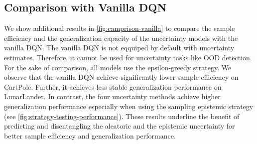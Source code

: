 
% 
% 
% 


% 
% 
% 


% 
% 
% 

\subsection{Comparison with Vanilla DQN}

We show additional results in \cref{fig:camprison-vanilla} to compare the sample efficiency and the generalization capacity of the uncertainty models with the vanilla DQN. The vanilla DQN is not eqquiped by default with uncertainty estimates. Therefore, it cannot be used for uncertainty tasks like OOD detection. For the sake of comparison, all models use the epsilon-greedy strategy. We observe that the vanilla DQN achieve significantly lower sample efficiency on CartPole. Further, it achieves less stable generalization performance on LunarLander. In contrast, the four uncertainty methods achieve higher generalization performance especially when using the sampling epistemic strategy (see \cref{fig:strategy-testing-performance}). These results underline the benefit of predicting and disentangling the aleatoric and the epistemic uncertainty for better sample efficiency and generalization performance.


%
%
%

